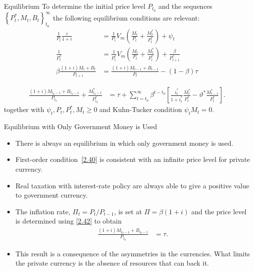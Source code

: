 \documentclass[11pt,aspectratio=169]{beamer}
\begin{document}
\begin{frame}{Equilibrium}
To determine the initial price level $P_{t_0}$ and the sequences $\left\{P_t^*, M_t, B_t \right\}_{t_0}^\infty$ the following equilibrium conditions are relevant: 
\begin{align}
\frac{1}{P_{t}}\frac{i}{1+i} &= \frac{1}{P_{t}}V_{m}\left(\frac{M_{t}}{P_{t}} + \frac{M_{t}^{*}}{P_{t}^{*}}\right) + \psi_{t} \label{2.39} \\
\frac{1}{P_{t}^{*}} &= \frac{1}{P_{t}^{*}}V_{m}\left(\frac{M_{t}}{P_{t}} + \frac{M_{t}^{*}}{P_{t}^{*}}\right) + \frac{\beta}{P_{t+1}^{*}} \label{2.40}  \\
    \beta\frac{(1+i)M_{t} + B_{t}}{P_{t+1}} &= \frac{(1+i)M_{t-1} + B_{t-1}}{P_{t}} - (1-\beta)\tau \label{2.41}  
    \end{align}

    \begin{align}
\frac{(1+i)M_{t_{0}-1} + B_{t_{0}-1}}{P_{t_{0}}} + \frac{M_{t_{0}-1}^{*}}{P_{t_{0}}^{*}} &= \tau + \sum_{t=t_{0}}^{\infty} \beta^{t-t_{0}}\left[\frac{i_{t}^{*}}{1+i_{t}^{*}}\frac{M_{t}^{*}}{P_{t}^{*}} - \vartheta^{*}\frac{M_{t-1}^{*}}{P_{t}^{*}}\right].  \label{2.42} 
\end{align}
together with $\psi_t, P_t, P_t^*, M_t \ge 0$ and Kuhn-Tucker condition $\psi_tM_t = 0$.

\end{frame}


\begin{frame}{Equilibrium with Only Government Money is Used}
\begin{itemize}
    \item There is always an equilibrium in which only government money is used. 
    \item First-order condition~\eqref{2.40} is consistent with an infinite price level for private currency. 
    \item Real taxation with interest-rate policy are always able to give a positive value to government currency. 
    \item The inflation rate, $\Pi_t = P_t / P_{t-1}$, is set at $\Pi = \beta (1 + i)$ and the price level is determined using \eqref{2.42} to obtain
\begin{align}
\frac{(1 + i) M_{t_0 - 1} + B_{t_0 - 1}}{P_{t_0}} &= \tau. \label{2.45}
\end{align}
    \item This result is a consequence of the asymmetries in the currencies. What limits the private currency is the absence of resources that can back it. 
\end{itemize}
\end{frame}
\end{document}
